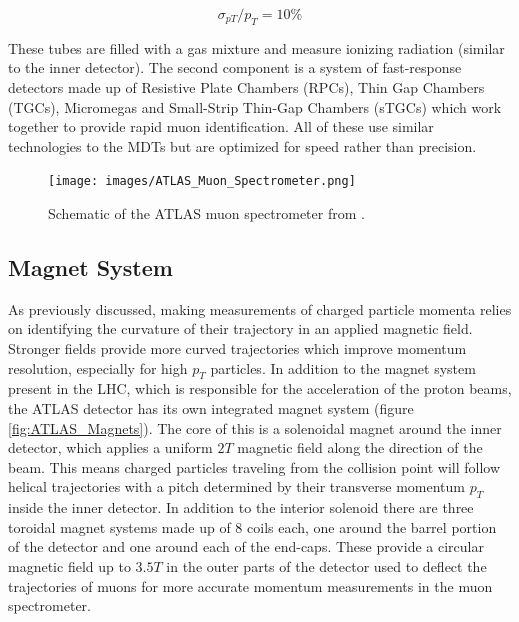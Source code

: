 \begin{equation} %
\sigma_{pT}/p_T = 10\%
\end{equation}

These tubes are filled with a gas mixture and measure ionizing radiation (similar to the inner detector). The second 
component is a system of fast-response detectors made up of Resistive Plate Chambers (RPCs), Thin Gap Chambers (TGCs), 
Micromegas and Small-Strip Thin-Gap Chambers (sTGCs) which work together to provide rapid muon identification. All of 
these use similar technologies to the MDTs but are optimized for speed rather than precision. \par

\begin{figure}
\centering
    \texttt{[image: images/ATLAS\_Muon\_Spectrometer.png]}
    \caption{Schematic of the ATLAS muon spectrometer from \cite{atlas-run3-setup}.}
    \label{fig:ATLAS_Muon_Spectrometer}
\end{figure}

\subsection{Magnet System}

As previously discussed, making measurements of charged particle momenta relies on identifying the curvature of their 
trajectory in an applied magnetic field. Stronger fields provide more curved trajectories which improve momentum 
resolution, especially for high $p_T$ particles. In addition to the magnet system present in the LHC, which is 
responsible for the acceleration of the proton beams, the ATLAS detector has its own integrated magnet system 
(figure \ref{fig:ATLAS_Magnets}). The core of this is a solenoidal magnet around the inner detector, which applies a 
uniform $2T$ magnetic field along the direction of the beam. This means charged particles traveling from the collision 
point will follow helical trajectories with a pitch determined by their transverse momentum $p_T$ inside the inner 
detector. In addition to the interior solenoid there are three toroidal magnet systems made up of 8 coils each, one 
around the barrel portion of the detector and one around each of the end-caps. These provide a circular magnetic field 
up to $3.5T$ in the outer parts of the detector used to deflect the trajectories of muons for more accurate momentum 
measurements in the muon spectrometer. \par

